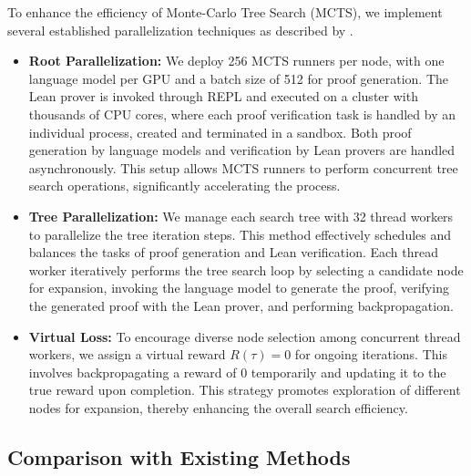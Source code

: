 To enhance the efficiency of Monte-Carlo Tree Search (MCTS), we implement several established parallelization techniques as described by \citet{chaslot2008parallel}.
\begin{itemize}
    \item \textbf{Root Parallelization:} We deploy 256 MCTS runners per node, with one language model per GPU and a batch size of 512 for proof generation. The Lean prover is invoked through REPL and executed on a cluster with thousands of CPU cores, where each proof verification task is handled by an individual process, created and terminated in a sandbox. Both proof generation by language models and verification by Lean provers are handled asynchronously. This setup allows MCTS runners to perform concurrent tree search operations, significantly accelerating the process.
    \item \textbf{Tree Parallelization:} We manage each search tree with 32 thread workers to parallelize the tree iteration steps. This method effectively schedules and balances the tasks of proof generation and Lean verification. Each thread worker iteratively performs the tree search loop by selecting a candidate node for expansion, invoking the language model to generate the proof, verifying the generated proof with the Lean prover, and performing backpropagation.
    \item \textbf{Virtual Loss:} To encourage diverse node selection among concurrent thread workers, we assign a virtual reward $R(\tau)=0$ for ongoing iterations. This involves backpropagating a reward of $0$ temporarily and updating it to the true reward upon completion. This strategy promotes exploration of different nodes for expansion, thereby enhancing the overall search efficiency.
\end{itemize}

\subsection{Comparison with Existing Methods}

